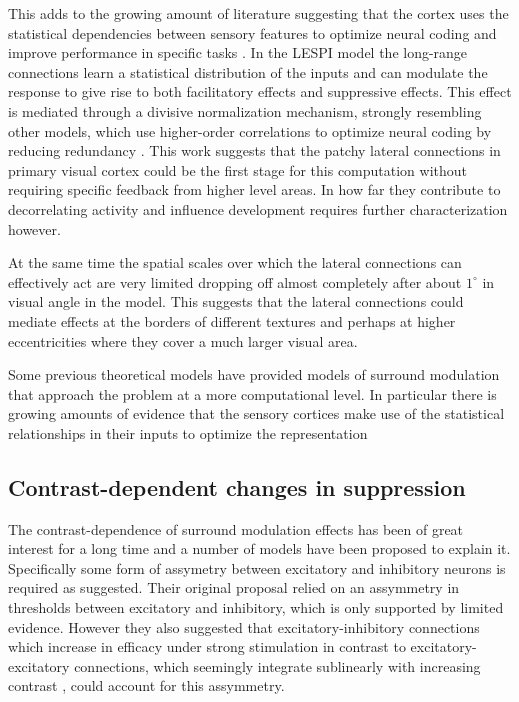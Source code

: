 This adds to the growing amount of literature suggesting that the
cortex uses the statistical dependencies between sensory features to
optimize neural coding \citep{Vinje2000, Simoncelli2001} and improve
performance in specific tasks \citep{Geisler2001}. In the LESPI model
the long-range connections learn a statistical distribution of the
inputs and can modulate the response to give rise to both facilitatory
effects and suppressive effects. This effect is mediated through a
divisive normalization mechanism, strongly resembling other models,
which use higher-order correlations to optimize neural coding by
reducing redundancy \citep{Spratling2011, Coen2015}. This work
suggests that the patchy lateral connections in primary visual cortex
could be the first stage for this computation without requiring
specific feedback from higher level areas. In how far they contribute
to decorrelating activity and influence development requires further
characterization however.

At the same time the spatial scales over which the lateral connections
can effectively act are very limited dropping off almost completely
after about $1^\circ$ in visual angle in the model. This suggests that
the lateral connections could mediate effects at the borders of
different textures and perhaps at higher eccentricities where they
cover a much larger visual area.

Some previous theoretical models have provided models of surround
modulation that approach the problem at a more computational level. In
particular there is growing amounts of evidence that the sensory
cortices make use of the statistical relationships in their inputs to
optimize the representation

\subsection{Contrast-dependent changes in suppression}

The contrast-dependence of surround modulation effects has been of
great interest for a long time and a number of models have been
proposed to explain it. Specifically some form of assymetry between
excitatory and inhibitory neurons is required as \cite{Somers1998}
suggested. Their original proposal relied on an assymmetry in
thresholds between excitatory and inhibitory, which is only supported
by limited evidence. However they also suggested that
excitatory-inhibitory connections which increase in efficacy under
strong stimulation in contrast to excitatory-excitatory connections,
which seemingly integrate sublinearly with increasing contrast
\citep{Abbott1997, Tsodyks1997}, could account for this assymmetry.

